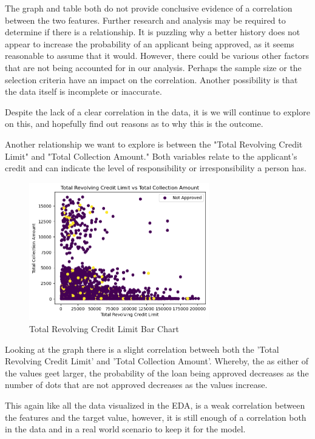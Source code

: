 \documentclass[sigplan]{acmart}
\begin{document}
The graph and table both do not provide conclusive evidence of a correlation between the two features. Further research and analysis may be required to determine if there is a relationship. It is puzzling why a better history does not appear to increase the probability of an applicant being approved, as it seems reasonable to assume that it would. However, there could be various other factors that are not being accounted for in our analysis. Perhaps the sample size or the selection criteria have an impact on the correlation. Another possibility is that the data itself is incomplete or inaccurate.

Despite the lack of a clear correlation in the data, it is  we will continue to explore on this, and hopefully find out reasons as to why this is the outcome.

Another relationship we want to explore is between the "Total Revolving Credit Limit" and "Total Collection Amount." Both variables relate to the applicant's credit and can indicate the level of responsibility or irresponsibility a person has.

\begin{figure}[!h]
    \centering
    \includegraphics[width=\linewidth, height=6cm]{images/trclvstca.png}
    \caption{Total Revolving Credit Limit Bar Chart}
    \vspace{-1cm}
\end{figure}

Looking at the graph there is a slight correlation betweeh both the 'Total Revolving Credit Limit' and 'Total Collection Amount'.
Whereby, the as either of the values geet larger, the probability of the loan being approved decreases as the number of dots that
are not approved decreases as the values increase.

This again like all the data visualized in the EDA, is a weak correlation between the features and the target value, however, it is still enough of a correlation
both in the data and in a real world scenario to keep it for the model.
\end{document}
